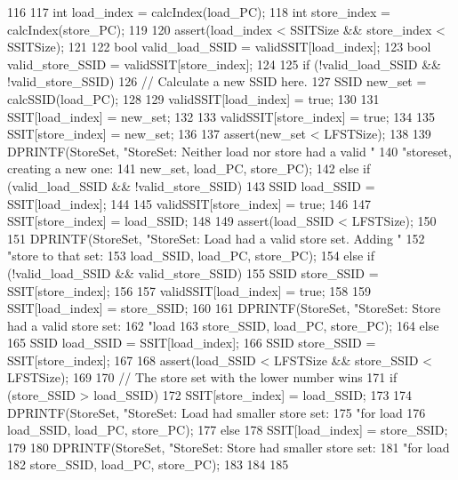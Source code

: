 \begin{DoxyCode}
116 {
117     int load_index = calcIndex(load_PC);
118     int store_index = calcIndex(store_PC);
119 
120     assert(load_index < SSITSize && store_index < SSITSize);
121 
122     bool valid_load_SSID = validSSIT[load_index];
123     bool valid_store_SSID = validSSIT[store_index];
124 
125     if (!valid_load_SSID && !valid_store_SSID) {
126         // Calculate a new SSID here.
127         SSID new_set = calcSSID(load_PC);
128 
129         validSSIT[load_index] = true;
130 
131         SSIT[load_index] = new_set;
132 
133         validSSIT[store_index] = true;
134 
135         SSIT[store_index] = new_set;
136 
137         assert(new_set < LFSTSize);
138 
139         DPRINTF(StoreSet, "StoreSet: Neither load nor store had a valid "
140                 "storeset, creating a new one: %
141                 new_set, load_PC, store_PC);
142     } else if (valid_load_SSID && !valid_store_SSID) {
143         SSID load_SSID = SSIT[load_index];
144 
145         validSSIT[store_index] = true;
146 
147         SSIT[store_index] = load_SSID;
148 
149         assert(load_SSID < LFSTSize);
150 
151         DPRINTF(StoreSet, "StoreSet: Load had a valid store set.  Adding "
152                 "store to that set: %
153                 load_SSID, load_PC, store_PC);
154     } else if (!valid_load_SSID && valid_store_SSID) {
155         SSID store_SSID = SSIT[store_index];
156 
157         validSSIT[load_index] = true;
158 
159         SSIT[load_index] = store_SSID;
160 
161         DPRINTF(StoreSet, "StoreSet: Store had a valid store set: %
162                 "load %
163                 store_SSID, load_PC, store_PC);
164     } else {
165         SSID load_SSID = SSIT[load_index];
166         SSID store_SSID = SSIT[store_index];
167 
168         assert(load_SSID < LFSTSize && store_SSID < LFSTSize);
169 
170         // The store set with the lower number wins
171         if (store_SSID > load_SSID) {
172             SSIT[store_index] = load_SSID;
173 
174             DPRINTF(StoreSet, "StoreSet: Load had smaller store set: %
175                     "for load %
176                     load_SSID, load_PC, store_PC);
177         } else {
178             SSIT[load_index] = store_SSID;
179 
180             DPRINTF(StoreSet, "StoreSet: Store had smaller store set: %
181                     "for load %
182                     store_SSID, load_PC, store_PC);
183         }
184     }
185 }
\end{DoxyCode}


